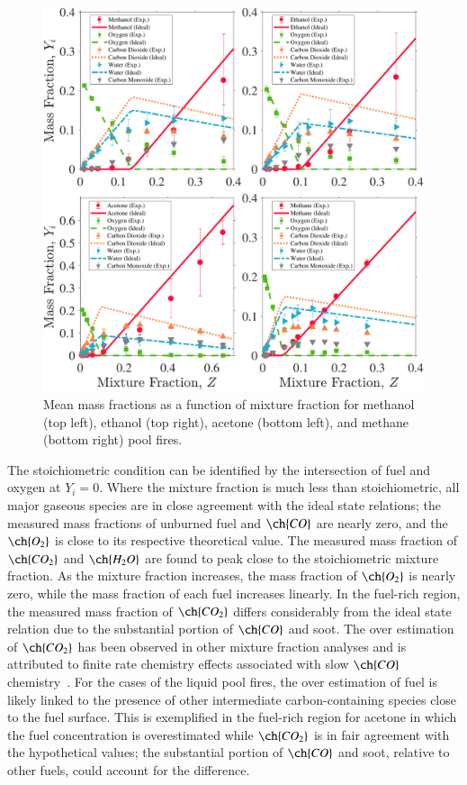 \documentclass[preprint,review,12pt]{elsarticle}
\begin{document}
\begin{figure}[!t]
	\centering
\includegraphics[width=14.27cm,keepaspectratio]{Combined_Mass_Frac_Mix_Frac.pdf}
	\caption[Mean mass fractions as a function of mixture fraction]{Mean mass fractions as a function of mixture fraction for methanol (top left), ethanol (top right), acetone (bottom left), and methane (bottom right) pool fires.}
	\label{fig:Mixture_Fraction}
\end{figure}

The stoichiometric condition can be identified by the intersection of fuel and oxygen at $Y_i=0$. Where the mixture fraction is much less than stoichiometric, all major gaseous species are in close agreement with the ideal state relations; the measured mass fractions of unburned fuel and $\ch{CO}$ are nearly zero, and the $\ch{O_2}$ is close to its respective theoretical value. The measured mass fraction of $\ch{CO_{2}}$ and $\ch{H_{2}O}$ are found to peak close to the stoichiometric mixture fraction. As the mixture fraction increases, the mass fraction of $\ch{O_2}$ is nearly zero, while the mass fraction of each fuel increases linearly. In the fuel-rich region, the measured mass fraction of $\ch{CO_{2}}$ differs considerably from the ideal state relation due to the substantial portion of $\ch{CO}$ and soot. The over estimation of $\ch{CO_{2}}$ has been observed in other mixture fraction analyses and is attributed to finite rate chemistry effects associated with slow $\ch{CO}$ chemistry~\cite{Sivathanu1990}. For the cases of the liquid pool fires, the over estimation of fuel is likely linked to the presence of other intermediate carbon-containing species close to the fuel surface. This is exemplified in the fuel-rich region for acetone in which the fuel concentration is overestimated while $\ch{CO_{2}}$ is in fair agreement with the hypothetical values; the substantial portion of $\ch{CO}$ and soot, relative to other fuels, could account for the difference.
\end{document}
